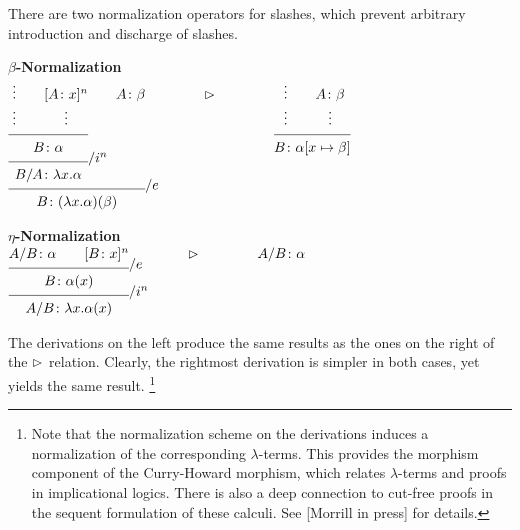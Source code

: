 There are two normalization operators for slashes, which prevent
arbitrary introduction and discharge of slashes.  
%
\begin{center}
{\bf $\beta$-Normalization}
\\[6pt]
{\small
$\infr{\infr{\infr{\; \sstc{\vdots \\ \vdots} 
                   \qquad
                   \sstc{\disch{\synsem{A}{x}}{n} 
                         \\
                         \vdots}}
                  {\synsem{B}{\alpha}}
                  {}}
            {\synsem{\fd{B}{A}}{\lam{x}{\alpha}}}
            {\fin{n}}
       \qquad
       \synsem{A}{\beta}}
      {\synsem{B}{(\lam{x}{\alpha})(\beta)}}
      {\fel}
\qquad \qquad
\normalizesto
\qquad \qquad
\infr{\; \sstc{\vdots \\ \vdots}
      \qquad
      \sstc{\synsem{A}{\beta} \\ \vdots}}
     {\synsem{B}{\alpha[x \mapsto \beta]}}
     {}$
}
\end{center}
%
\begin{center}
\begin{minipage}{\textwidth}
\begin{center}
{\bf $\eta$-Normalization}
\\[6pt]
$\infr{\infr{{\synsem{\fd{A}{B}}{\alpha}} \qquad 
             {\disch{\synsem{B}{x}}{n}}}
            {\synsem{B}{\alpha(x)}}
            {\fel}}
      {\synsem{\fd{A}{B}}{\lam{x}{\alpha(x)}}}
      {\fin{n}}
\qquad \qquad
\normalizesto
\qquad \qquad
\synsem{\fd{A}{B}}{\alpha}
$
\end{center}
\end{minipage}
\end{center}
%
The derivations on the left produce the same results as the ones on
the right of the $\rhd$ relation.  Clearly, the rightmost
derivation is simpler in both cases, yet yields the same result.%
%
\footnote{Note that the normalization scheme on the derivations induces a
normalization of the corresponding $\lambda$-terms.  This provides the
morphism component of the Curry-Howard morphism, which relates
$\lambda$-terms and proofs in implicational logics.  There is also a
deep connection to cut-free proofs in the sequent formulation of these
calculi.  See [Morrill in press] for details.}

